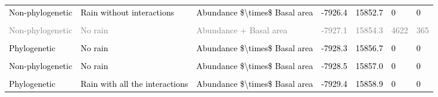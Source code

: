 \documentclass[
  12pt,
  letterpaper,
  DIV=11,
  numbers=noendperiod]{scrartcl}
\begin{document}
\begin{table}[H]
{\begin{tabular}[t]{lllllll}
\addlinespace
\textcolor{black}{Non-phylogenetic} & \textcolor{black}{Rain without interactions} & \textcolor{black}{Abundance \$\textbackslash{}times\$ Basal area} & \textcolor{black}{-7926.4} & \textcolor{black}{15852.7} & \textcolor{black}{0} & \textcolor{black}{0}\\
\cellcolor{gray!6}{\textcolor{gray}{Phylogenetic}} & \cellcolor{gray!6}{\textcolor{gray}{Rain with all the interactions}} & \cellcolor{gray!6}{\textcolor{gray}{Abundance + Basal area}} & \cellcolor{gray!6}{\textcolor{gray}{-7926.9}} & \cellcolor{gray!6}{\textcolor{gray}{15853.9}} & \cellcolor{gray!6}{\textcolor{gray}{0}} & \cellcolor{gray!6}{\textcolor{gray}{2}}\\
\textcolor{gray}{Non-phylogenetic} & \textcolor{gray}{No rain} & \textcolor{gray}{Abundance + Basal area} & \textcolor{gray}{-7927.1} & \textcolor{gray}{15854.3} & \textcolor{gray}{4622} & \textcolor{gray}{365}\\
\cellcolor{gray!6}{\textcolor{gray}{Phylogenetic}} & \cellcolor{gray!6}{\textcolor{gray}{No rain}} & \cellcolor{gray!6}{\textcolor{gray}{Abundance + Basal area}} & \cellcolor{gray!6}{\textcolor{gray}{-7927.6}} & \cellcolor{gray!6}{\textcolor{gray}{15855.3}} & \cellcolor{gray!6}{\textcolor{gray}{2938}} & \cellcolor{gray!6}{\textcolor{gray}{108}}\\
\textcolor{black}{Phylogenetic} & \textcolor{black}{No rain} & \textcolor{black}{Abundance \$\textbackslash{}times\$ Basal area} & \textcolor{black}{-7928.3} & \textcolor{black}{15856.7} & \textcolor{black}{0} & \textcolor{black}{0}\\
\addlinespace
\cellcolor{gray!6}{\textcolor{black}{Non-phylogenetic}} & \cellcolor{gray!6}{\textcolor{black}{Rain with all the interactions}} & \cellcolor{gray!6}{\textcolor{black}{Abundance + Basal area}} & \cellcolor{gray!6}{\textcolor{black}{-7928.4}} & \cellcolor{gray!6}{\textcolor{black}{15856.8}} & \cellcolor{gray!6}{\textcolor{black}{0}} & \cellcolor{gray!6}{\textcolor{black}{0}}\\
\textcolor{black}{Non-phylogenetic} & \textcolor{black}{No rain} & \textcolor{black}{Abundance \$\textbackslash{}times\$ Basal area} & \textcolor{black}{-7928.5} & \textcolor{black}{15857.0} & \textcolor{black}{0} & \textcolor{black}{0}\\
\cellcolor{gray!6}{\textcolor{black}{Non-phylogenetic}} & \cellcolor{gray!6}{\textcolor{black}{Rain with all the interactions}} & \cellcolor{gray!6}{\textcolor{black}{Abundance \$\textbackslash{}times\$ Basal area}} & \cellcolor{gray!6}{\textcolor{black}{-7929.1}} & \cellcolor{gray!6}{\textcolor{black}{15858.1}} & \cellcolor{gray!6}{\textcolor{black}{0}} & \cellcolor{gray!6}{\textcolor{black}{0}}\\
\textcolor{black}{Phylogenetic} & \textcolor{black}{Rain with all the interactions} & \textcolor{black}{Abundance \$\textbackslash{}times\$ Basal area} & \textcolor{black}{-7929.4} & \textcolor{black}{15858.9} & \textcolor{black}{0} & \textcolor{black}{0}\\
\bottomrule
\end{tabular}}
\end{table}
\end{document}

